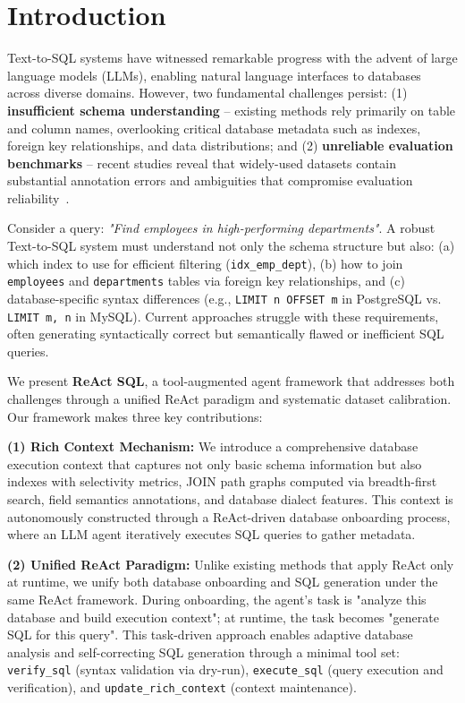 \section{Introduction}

Text-to-SQL systems have witnessed remarkable progress with the advent of large language models (LLMs), enabling natural language interfaces to databases across diverse domains. However, two fundamental challenges persist: (1) \textbf{insufficient schema understanding} -- existing methods rely primarily on table and column names, overlooking critical database metadata such as indexes, foreign key relationships, and data distributions; and (2) \textbf{unreliable evaluation benchmarks} -- recent studies reveal that widely-used datasets contain substantial annotation errors and ambiguities that compromise evaluation reliability~\cite{renggli2025fundamental}.

Consider a query: \textit{"Find employees in high-performing departments"}. A robust Text-to-SQL system must understand not only the schema structure but also: (a) which index to use for efficient filtering (\texttt{idx\_emp\_dept}), (b) how to join \texttt{employees} and \texttt{departments} tables via foreign key relationships, and (c) database-specific syntax differences (e.g., \texttt{LIMIT n OFFSET m} in PostgreSQL vs. \texttt{LIMIT m, n} in MySQL). Current approaches struggle with these requirements, often generating syntactically correct but semantically flawed or inefficient SQL queries.

We present \textbf{ReAct SQL}, a tool-augmented agent framework that addresses both challenges through a unified ReAct paradigm and systematic dataset calibration. Our framework makes three key contributions:

\textbf{(1) Rich Context Mechanism:} We introduce a comprehensive database execution context that captures not only basic schema information but also indexes with selectivity metrics, JOIN path graphs computed via breadth-first search, field semantics annotations, and database dialect features. This context is autonomously constructed through a ReAct-driven database onboarding process, where an LLM agent iteratively executes SQL queries to gather metadata.

\textbf{(2) Unified ReAct Paradigm:} Unlike existing methods that apply ReAct only at runtime, we unify both database onboarding and SQL generation under the same ReAct framework. During onboarding, the agent's task is "analyze this database and build execution context"; at runtime, the task becomes "generate SQL for this query". This task-driven approach enables adaptive database analysis and self-correcting SQL generation through a minimal tool set: \texttt{verify\_sql} (syntax validation via dry-run), \texttt{execute\_sql} (query execution and verification), and \texttt{update\_rich\_context} (context maintenance).

